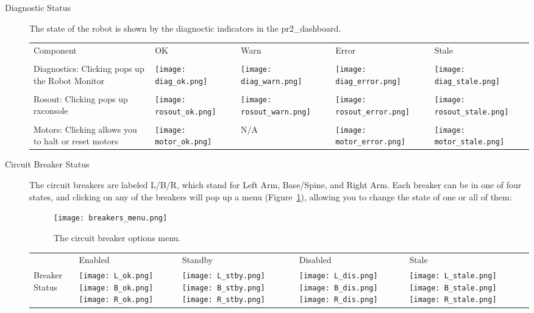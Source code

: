\begin{description}
\item[Diagnostic Status] The state of the robot is shown by the diagnoctic indicators in the pr2\_dashboard. \\

    \begin{tabular}{m{6cm}SSSS}
    Component & OK & Warn & Error & Stale\\
    &&&&\\
    Diagnostics: Clicking pops up the Robot Monitor & \texttt{[image: diag\_ok.png]}&\texttt{[image: diag\_warn.png]}&
                                                      \texttt{[image: diag\_error.png]}&\texttt{[image: diag\_stale.png]}\\
    &&&&\\
    Rosout: Clicking pops up rxconsole & \texttt{[image: rosout\_ok.png]}&\texttt{[image: rosout\_warn.png]}&
                                        \texttt{[image: rosout\_error.png]}&\texttt{[image: rosout\_stale.png]}\\
    &&&&\\
    Motors: Clicking allows you to halt or reset motors & \texttt{[image: motor\_ok.png]}& N/A &
                                                          \texttt{[image: motor\_error.png]}&\texttt{[image: motor\_stale.png]}\\
   \end{tabular}

\item[Circuit Breaker Status] The circuit breakers are labeled L/B/R, which stand for Left Arm, Base/Spine, and Right Arm. 
Each breaker can be in one of four states, and clicking on any of the breakers will pop up a menu (Figure~\ref{fig:breaker_menu}), allowing you to change the state of one or all of them:
\begin{figure}[h]
\centering
\texttt{[image: breakers\_menu.png]}
\caption{The circuit breaker options menu.}
\label{fig:breaker_menu}
\end{figure}

    \begin{tabular}{m{2.6cm}SSSS}
     & Enabled & Standby & Disabled & Stale\\
    Breaker Status & \texttt{[image: L\_ok.png]}\texttt{[image: B\_ok.png]}\texttt{[image: R\_ok.png]}&
                     \texttt{[image: L\_stby.png]}\texttt{[image: B\_stby.png]}\texttt{[image: R\_stby.png]}&
                     \texttt{[image: L\_dis.png]}\texttt{[image: B\_dis.png]}\texttt{[image: R\_dis.png]}&
                     \texttt{[image: L\_stale.png]}\texttt{[image: B\_stale.png]}\texttt{[image: R\_stale.png]}\\
   \end{tabular}




\end{description}
